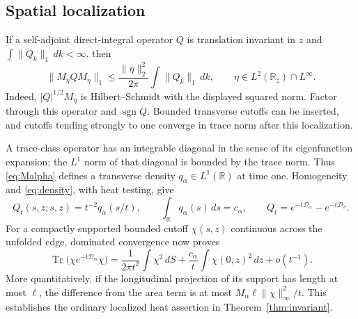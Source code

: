 \documentclass[11pt]{amsart}
\numberwithin{equation}{section}
\theoremstyle{remark}
\newcommand{\R}{\mathbb{R}}
\newcommand{\Tr}{\operatorname{Tr}}
\newcommand{\sgn}{\operatorname{sgn}}
\newcommand{\Dcal}{\mathcal{D}}
\begin{document}
\subsection{Spatial localization}
If a self-adjoint direct-integral operator $Q$ is translation invariant in $z$ and $\int\|Q_k\|_1\,dk<\infty$, then
\begin{equation}\label{eq:localize}
\|M_\eta QM_\eta\|_1\le\frac{\|\eta\|_2^2}{2\pi}\int\|Q_k\|_1\,dk,\qquad \eta\in L^2(\R_z)\cap L^\infty .
\end{equation}
Indeed, $|Q|^{1/2}M_\eta$ is Hilbert--Schmidt with the displayed squared norm. Factor through this operator and $\sgn Q$. Bounded transverse cutoffs can be inserted, and cutoffs tending strongly to one converge in trace norm after this localization.

A trace-class operator has an integrable diagonal in the sense of its eigenfunction expansion; the $L^1$ norm of that diagonal is bounded by the trace norm. Thus \eqref{eq:Malpha} defines a transverse density $q_\alpha\in L^1(\R)$ at time one. Homogeneity and \eqref{eq:density}, with heat testing, give
\begin{equation}\label{eq:qalpha}
Q_t(s,z;s,z)=t^{-2}q_\alpha(s/t),\qquad \int_\R q_\alpha(s)\,ds=c_\alpha,\qquad Q_t=e^{-t\Dcal_\alpha}-e^{-t\Dcal_\pi} .
\end{equation}
For a compactly supported bounded cutoff $\chi(s,z)$ continuous across the unfolded edge, dominated convergence now proves
\begin{equation}\label{eq:localheat}
\Tr\big(\chi e^{-t\Dcal_\alpha}\chi\big)=\frac{1}{2\pi t^2}\int\chi^2\,dS+\frac{c_\alpha}{t}\int\chi(0,z)^2\,dz+o(t^{-1}) .
\end{equation}
More quantitatively, if the longitudinal projection of its support has length at most $\ell$, the difference from the area term is at most $M_\alpha\ell\|\chi\|_\infty^2/t$. This establishes the ordinary localized heat assertion in Theorem~\ref{thm:invariant}.
\end{document}
